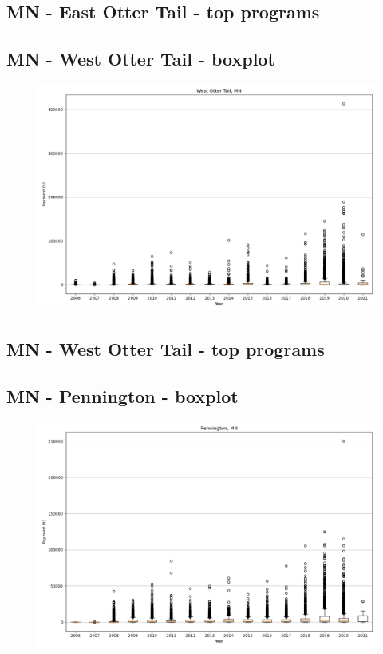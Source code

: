 \subsection*{MN - East Otter Tail - top programs}

\newpage
\subsection*{MN - West Otter Tail - boxplot}
\begin{figure}[h]
\centering
\includegraphics[width=7in]{../output/boxplots/counties/West Otter Tail-MN_boxplot.png}
\end{figure}


\subsection*{MN - West Otter Tail - top programs}

\newpage
\subsection*{MN - Pennington - boxplot}
\begin{figure}[h]
\centering
\includegraphics[width=7in]{../output/boxplots/counties/Pennington-MN_boxplot.png}
\end{figure}


